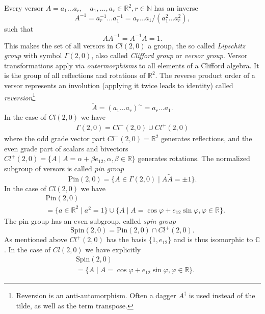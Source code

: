 \documentclass[cameraready]{jcmsi}%
\newcommand{\R}{\mathbb{R}}
\newcommand{\C}{\mathbb{C}}
\newcommand{\N}{\mathbb{N}}
\newcommand{\be}{\begin{equation}}
\newcommand{\ee}{\end{equation}}
\newcommand{\Pin}{\mathrm{Pin}}
\newcommand{\Spin}{\mathrm{Spin}}
\begin{document}
Every versor $A = a_1\ldots a_r, \quad a_1, \ldots, a_r \in \R^2, r\in \N$ has an inverse 
\be 
  A^{-1} = a_r^{-1}\ldots a_1^{-1} = a_r\ldots a_1/(a_1^2 \ldots a_r^2), 
\ee 
such that
\be 
  A A^{-1} = A^{-1} A = 1.
\ee 
This makes the set of all versors in $Cl(2,0)$ a group, the so called \textit{Lipschitz group} with symbol $\Gamma(2,0)$, also called \textit{Clifford group} or \textit{versor group}. Versor transformations apply via \textit{outermorphisms} to all elements of a Clifford algebra. It is the group of all reflections and rotations of $\R^2$. The reverse product order of a versor represents an involution (applying it twice leads to identity) called \textit{reversion}\footnote{Reversion is an anti-automorphism. Often a dagger $A^{\dagger}$ is used instead of the tilde, as well as the term transpose.}
\be 
  \widetilde{A} = (a_1\ldots a_r)^{\sim} = a_r\ldots a_1. 
\ee 
In the case of $Cl(2,0)$ we have 
\begin{gather}
  \Gamma(2,0) = Cl^-(2,0) \cup Cl^+(2,0)
\end{gather}
where the odd grade vector part $Cl^-(2,0)=\R^2$ generates reflections, and the even grade part of scalars and bivectors 
$Cl^+(2,0)= \{A \mid A = \alpha + \beta e_{12}, \alpha,\beta \in \R \}$
 generates rotations. 
The normalized subgroup of versors is called \textit{pin group}
\be 
  \Pin(2,0) = \{A\in \Gamma(2,0) \mid A\widetilde{A}= \pm 1\}.
\ee 
In the case of $Cl(2,0)$ we have 
\begin{align}
  &\Pin(2,0) 
  \\
  &= \{a \in \R^2 \mid a^2=1 \} \cup 
  \{A \mid A = \cos \varphi + e_{12} \sin \varphi , \varphi \in \R \}.
    \nonumber 
\end{align} 
The pin group has an even subgroup, called \textit{spin group}
\be 
  \Spin(2,0) = \Pin(2,0) \cap Cl^+(2,0).
\ee 
As mentioned above $Cl^+(2,0)$ has the basis $\{1, e_{12}\}$ and is thus isomorphic to $\C$. 
In the case of $Cl(2,0)$ we have explicitly
\begin{align} 
  &\Spin(2,0) 
  \\
  &= \{A \mid  A = \cos \varphi + e_{12} \sin \varphi , \varphi \in \R \}.
  \nonumber 
\end{align}
\end{document}
